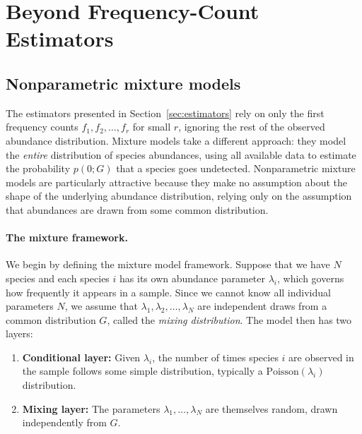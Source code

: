 ﻿\documentclass{article}
\begin{document}
\clearpage
\section{Beyond Frequency-Count Estimators}\label{sec:shape}

\subsection{Nonparametric mixture models}\label{sec:mixture_models}

The estimators presented in Section~\ref{sec:estimators} rely on only the first frequency counts $f_1, f_2, \ldots, f_r$ for small $r$, ignoring the rest of the observed abundance distribution. Mixture models take a different approach: they model the \emph{entire} distribution of species abundances, using all available data to estimate the probability $p(0;G)$ that a species goes undetected. Nonparametric mixture models are particularly attractive because they make no assumption about the shape of the underlying abundance distribution, relying only on the assumption that abundances are drawn from some common distribution.

\paragraph{The mixture framework.}
We begin by defining the mixture model framework. Suppose that we have $N$ species and each species $i$ has its own abundance parameter $\lambda_i$, which governs how frequently it appears in a sample. Since we cannot know all individual parameters $N$, we assume that $\lambda_1, \lambda_2, \ldots, \lambda_N$ are independent draws from a common distribution $G$, called the \emph{mixing distribution}. The model then has two layers:
\begin{enumerate}
    \item \textbf{Conditional layer:} Given $\lambda_i$, the number of times species $i$ are observed in the sample follows some simple distribution, typically a $\mathrm{Poisson}(\lambda_i)$ distribution.
    \item \textbf{Mixing layer:} The parameters $\lambda_1, \ldots, \lambda_N$ are themselves random, drawn independently from $G$.
\end{enumerate}
\end{document}
